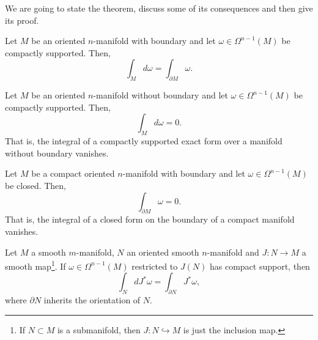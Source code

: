 We are going to state the theorem, discuss some of its consequences and then give its proof.

\begin{theorem}\label{thm:Stokes}
  Let $M$ be an oriented $n$-manifold with boundary and let $\omega\in\Omega^{n-1}(M)$ be compactly supported.
  Then,
  \begin{equation}\label{eq:Stokes}
    \int_M d\omega = \int_{\partial M} \omega.
  \end{equation}
\end{theorem}

\begin{corollary}
  Let $M$ be an oriented $n$-manifold without boundary and let $\omega\in\Omega^{n-1}(M)$ be compactly supported.
  Then,
  \begin{equation}
    \int_M d\omega = 0.
  \end{equation}
  That is, the integral of a compactly supported exact form over a manifold without boundary vanishes.
\end{corollary}

\begin{corollary}
  Let $M$ be a compact oriented $n$-manifold with boundary and let $\omega\in\Omega^{n-1}(M)$ be closed.
  Then,
  \begin{equation}
    \int_{\partial M} \omega = 0.
  \end{equation}
  That is, the integral of a closed form on the boundary of a compact manifold vanishes.
\end{corollary}

\begin{corollary}
  Let $M$ a smooth $m$-manifold, $N$ an oriented smooth $n$-manifold and $J:N\to M$ a smooth map\footnote{If $N\subset M$ is a submanifold, then $J:N\hookrightarrow M$ is just the inclusion map.}.
  If $\omega\in\Omega^{n-1}(M)$ restricted to $J(N)$ has compact support, then
  \begin{equation}
    \int_{N} d J^*\omega = \int_{\partial N} J^*\omega,
  \end{equation}
  where $\partial N$ inherits the orientation of $N$.
\end{corollary}

